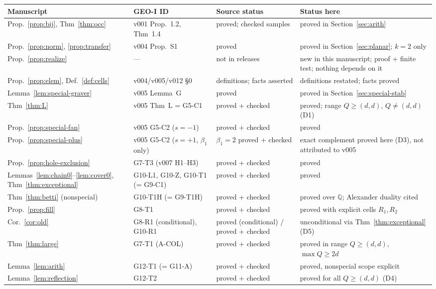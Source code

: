 \begin{longtable}{@{}p{2.9cm}p{2.8cm}p{3.0cm}p{4.6cm}@{}}
\toprule Manuscript & GEO-I ID & Source status & Status here\\\midrule\endhead
Prop.~\ref{prop:bij}, Thm~\ref{thm:occ} & v001 Prop.~1.2, Thm~1.4 & proved; checked samples & proved in Section~\ref{sec:arith}\\
Prop.~\ref{prop:norm}, \ref{prop:transfer} & v004 Prop.~S1 & proved & proved in Section~\ref{sec:planar}; $k=2$ only\\
Prop.~\ref{prop:realize} & --- & not in releases & new in this manuscript; proof + finite test; nothing depends on it\\
Prop.~\ref{prop:elem}, Def.~\ref{def:cells} & v004/v005/v012 \S0 & definitions; facts asserted & definitions restated; facts proved\\
Lemma~\ref{lem:special-graver} & v005 Lemma~G & proved & proved in Section~\ref{sec:special-stab}\\
Thm~\ref{thm:L} & v005 Thm~L = G5-C1 & proved + checked & proved; range $Q\ge(d,d)$, $Q\ne(d,d)$ (D1)\\
Prop.~\ref{prop:special-fan} & v005 G5-C2 ($s=-1$) & proved + checked & proved\\
Prop.~\ref{prop:special-plus} & v005 G5-C2 ($s=+1$, $\beta_1$ only) & $\beta_1=2$ proved + checked & exact complement proved here (D3), not attributed to v005\\
Prop.~\ref{prop:hole-exclusion} & G7-T3 (v007 H1--H3) & proved + checked & proved\\
Lemmas~\ref{lem:chain0}--\ref{lem:cover0}, Thm~\ref{thm:exceptional} & G10-L1, G10-Z, G10-T1 (= G9-C1) & proved + checked & proved\\
Thm~\ref{thm:betti} (nonspecial) & G10-T1H (= G9-T1H) & proved + checked & proved over $\mathbb Q$; Alexander duality cited\\
Prop.~\ref{prop:fill} & G8-T1 & proved + checked & proved with explicit cells $R_1,R_2$\\
Cor.~\ref{cor:old} & G8-R1 (conditional), G10-R1 & proved (conditional) / proved + checked & unconditional via Thm~\ref{thm:exceptional} (D5)\\
Thm~\ref{thm:large} & G7-T1 (A-COL) & proved + checked & proved in range $Q\ge(d,d)$, $\max Q\ge2d$\\
Lemma~\ref{lem:arith} & G12-T1 (= G11-A) & proved + checked & proved, nonspecial scope explicit\\
Lemma~\ref{lem:reflection} & G12-T2 & proved + checked & proved for all $Q\ge(d,d)$ (D4)\\

\end{longtable}

